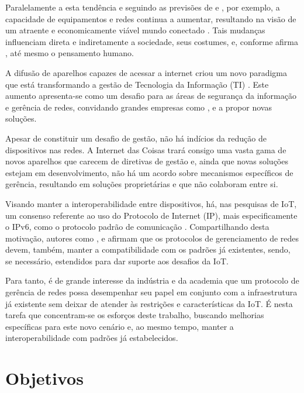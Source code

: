 \documentclass[twoside,english,brazilian]{UNISINOSmonografia}
\begin{document}
	Paralelamente a esta tendência e seguindo as previsões de 
	 e , por exemplo, a capacidade 
	de equipamentos e redes continua a aumentar, resultando na visão de um 
	atraente e economicamente viável mundo conectado \cite{Ding2009}.
	Tais mudanças influenciam direta e indiretamente a sociedade, seus 
	costumes, e, conforme afirma , até mesmo o pensamento 
	humano.
	
	A difusão de aparelhos capazes de acessar a internet criou um novo 
	paradigma que está transformando a gestão de Tecnologia da Informação (TI) 
	\cite{ZdnetBYOD}.
	Este aumento apresenta-se como um desafio para as áreas de segurança da 
	informação e gerência de redes, convidando grandes empresas como 
	,  e  a 
	propor novas soluções.
	
	Apesar de constituir um desafio de gestão, não há indícios da redução de 
	dispositivos nas redes. A Internet das Coisas trará consigo uma vasta gama 
	de novos aparelhos que carecem de diretivas de gestão \cite{Atzori2010b} 
	e, ainda que novas soluções estejam em desenvolvimento, não há um acordo 
	sobre mecanismos específicos de gerência, resultando em soluções 
	proprietárias e que não colaboram entre si.
	
	Visando manter a interoperabilidade entre dispositivos, há, nas pesquisas 
	de IoT, um consenso referente ao uso do Protocolo de Internet (IP), mais 
	especificamente o IPv6, como o protocolo padrão de comunicação 
	\cite{Dunkels2008,Mattern2010a,Feng2011,Paventhan2012}.
	Compartilhando desta motivação, autores como , 
	 e 
	afirmam que os protocolos de gerenciamento de redes devem, também, manter 
	a compatibilidade com os padrões já existentes, sendo, se necessário, 
	estendidos para dar suporte aos desafios da IoT.
	
	Para tanto, é de grande interesse da indústria e da academia que um 
	protocolo de gerência de redes possa desempenhar seu papel em conjunto com 
	a infraestrutura já existente sem deixar de atender às restrições e 
	características da IoT. É nesta tarefa que concentram-se os esforços deste 
	trabalho, buscando melhorias específicas para este novo cenário e, ao 
	mesmo tempo, manter a interoperabilidade com padrões já estabelecidos.
	
\section{Objetivos}
\end{document}
